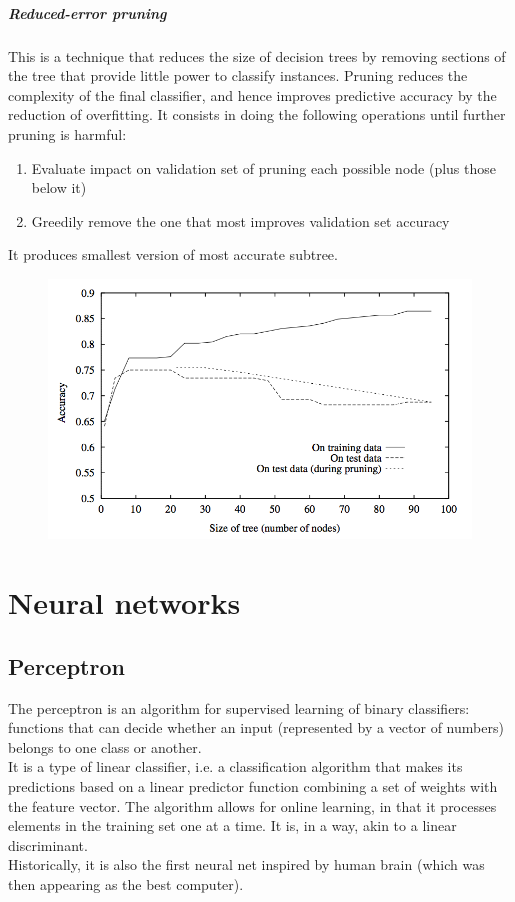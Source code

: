 \paragraph{Reduced-error pruning} This is a technique that reduces the size of decision trees by removing sections of the tree that provide little power to classify instances. Pruning reduces the complexity of the final classifier, and hence improves predictive accuracy by the reduction of overfitting. It consists in doing the following operations until further pruning is harmful:
\begin{enumerate}
    \item Evaluate impact on validation set of pruning each possible node (plus those below it)
    \item Greedily remove the one that most improves validation set accuracy
\end{enumerate}
It produces smallest version of most accurate subtree.
\begin{figure}
    \centering
    \includegraphics[width=.7\linewidth]{img/pruning}
\end{figure}


\chapter{Neural networks}
\section{Perceptron}
The perceptron is an algorithm for supervised learning of binary classifiers: functions that can decide whether an input (represented by a vector of numbers) belongs to one class or another.\\
\linebreak 
It is a type of linear classifier, i.e. a classification algorithm that makes its predictions based on a linear predictor function combining a set of weights with the feature vector. The algorithm allows for online learning, in that it processes elements in the training set one at a time. It is, in a way, akin to a linear discriminant.\\
\linebreak
Historically, it is also the first neural net inspired by human brain (which was then appearing as the best computer).

